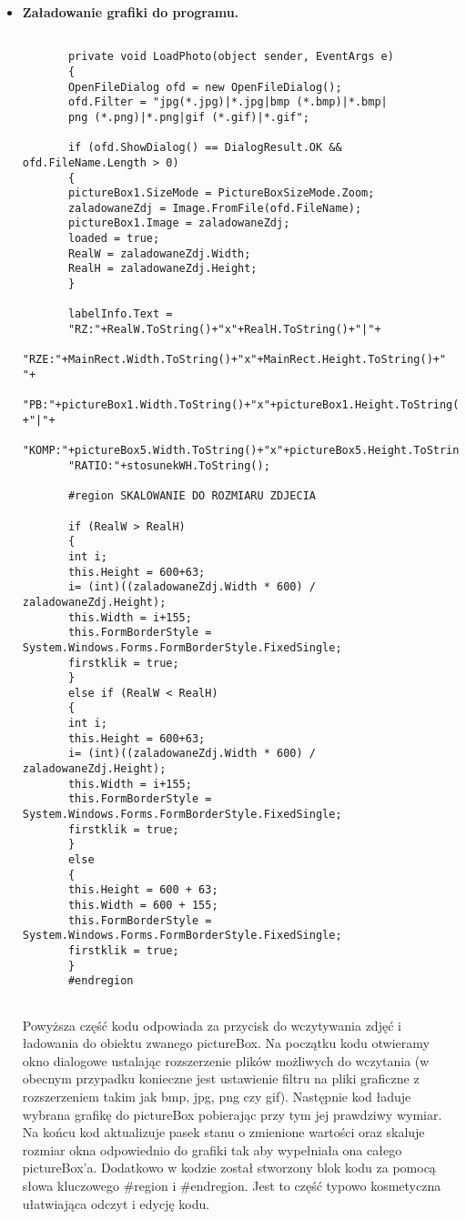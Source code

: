 \begin{itemize}
\item \textbf{Załadowanie grafiki do programu.}\\
\begin{lstlisting}
	
	   private void LoadPhoto(object sender, EventArgs e)
	   {
	   OpenFileDialog ofd = new OpenFileDialog();
	   ofd.Filter = "jpg(*.jpg)|*.jpg|bmp (*.bmp)|*.bmp|
	   png (*.png)|*.png|gif (*.gif)|*.gif";
	   
	   if (ofd.ShowDialog() == DialogResult.OK && ofd.FileName.Length > 0)
	   {
	   pictureBox1.SizeMode = PictureBoxSizeMode.Zoom;
	   zaladowaneZdj = Image.FromFile(ofd.FileName);
	   pictureBox1.Image = zaladowaneZdj;
	   loaded = true;
	   RealW = zaladowaneZdj.Width;
	   RealH = zaladowaneZdj.Height;
	   }
	   
	   labelInfo.Text =
	   "RZ:"+RealW.ToString()+"x"+RealH.ToString()+"|"+
	   "RZE:"+MainRect.Width.ToString()+"x"+MainRect.Height.ToString()+" "+
	   "PB:"+pictureBox1.Width.ToString()+"x"+pictureBox1.Height.ToString() +"|"+
	   "KOMP:"+pictureBox5.Width.ToString()+"x"+pictureBox5.Height.ToString()+"|"+
	   "RATIO:"+stosunekWH.ToString();
	   
	   #region SKALOWANIE DO ROZMIARU ZDJECIA
	   
	   if (RealW > RealH)
	   {
	   int i;
	   this.Height = 600+63;
	   i= (int)((zaladowaneZdj.Width * 600) / zaladowaneZdj.Height);
	   this.Width = i+155;               
	   this.FormBorderStyle = System.Windows.Forms.FormBorderStyle.FixedSingle;
	   firstklik = true;
	   }
	   else if (RealW < RealH)
	   {
	   int i;
	   this.Height = 600+63;  
	   i= (int)((zaladowaneZdj.Width * 600) / zaladowaneZdj.Height);
	   this.Width = i+155;             
	   this.FormBorderStyle = System.Windows.Forms.FormBorderStyle.FixedSingle;
	   firstklik = true;
	   }
	   else 
	   {
	   this.Height = 600 + 63;
	   this.Width = 600 + 155;
	   this.FormBorderStyle = System.Windows.Forms.FormBorderStyle.FixedSingle;
	   firstklik = true;
	   }
	   #endregion
	   
	\end{lstlisting}
	
Powyższa część kodu odpowiada za przycisk do wczytywania zdjęć i ładowania do obiektu zwanego pictureBox.
Na początku kodu otwieramy okno dialogowe ustalając rozszerzenie plików możliwych do wczytania (w obecnym przypadku konieczne jest ustawienie filtru na pliki graficzne z rozszerzeniem takim jak bmp, jpg, png czy gif). Następnie kod ładuje wybrana grafikę do pictureBox pobierając przy tym jej prawdziwy wymiar. Na końcu kod aktualizuje pasek stanu o zmienione wartości oraz skaluje rozmiar okna odpowiednio do grafiki tak aby wypełniała ona całego pictureBox'a. Dodatkowo w kodzie został stworzony blok kodu za pomocą słowa kluczowego \#region i \#endregion. Jest to część typowo kosmetyczna ułatwiająca odczyt i edycję kodu.	
\end{itemize}
 
